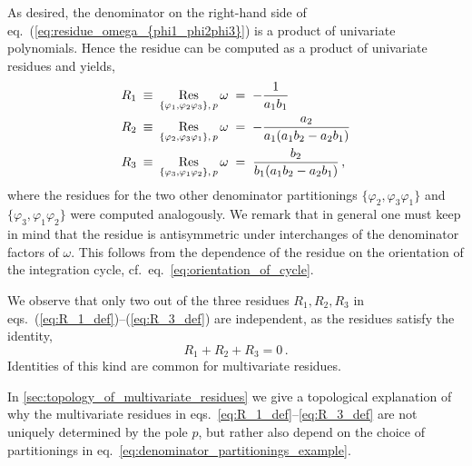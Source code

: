 \documentclass[dvipsnames,preprint,12pt,sort&compress]{elsarticle}
\begin{document}
As desired, the denominator on the right-hand side of eq.~(\ref{eq:residue_omega_{phi1_phi2phi3}})
is a product of univariate polynomials. Hence the residue can
be computed as a product of univariate residues and yields,
\begin{align}
R_1 \hspace{0.8mm}\equiv\hspace{0.8mm} \mathop{\mathrm{Res}}_{\{ \varphi_1, \varphi_2 \varphi_3 \}, \hspace{0.5mm} p} \omega
\hspace{1mm}&=\hspace{1mm} -\frac{1}{a_1 b_1}  \label{eq:R_1_def} \\
R_2 \hspace{0.8mm}\equiv\hspace{0.8mm} \mathop{\mathrm{Res}}_{\{ \varphi_2, \varphi_3 \varphi_1 \}, \hspace{0.5mm} p} \omega
\hspace{1mm}&=\hspace{1mm} -\frac{a_2}{a_1 (a_1 b_2 - a_2 b_1)} \label{eq:R_2_def} \\
R_3 \hspace{0.8mm}\equiv\hspace{0.8mm} \mathop{\mathrm{Res}}_{\{ \varphi_3, \varphi_1 \varphi_2 \}, \hspace{0.5mm} p} \omega
\hspace{1mm}&=\hspace{1mm} \frac{b_2}{b_1 (a_1 b_2 - a_2 b_1)} \,, \label{eq:R_3_def}
\end{align}
where the residues for the two other denominator partitionings $\{ \varphi_2, \varphi_3 \varphi_1\}$
and $\{ \varphi_3, \varphi_1 \varphi_2\}$ were computed analogously.
We remark that in general one must keep in mind that the residue
is antisymmetric under interchanges of the denominator factors of $\omega$.
This follows from the dependence of the residue on the orientation of
the integration cycle, cf.~eq.~\eqref{eq:orientation_of_cycle}.

We observe that only two out of the three residues $R_1, R_2, R_3$
in eqs.~(\ref{eq:R_1_def})--(\ref{eq:R_3_def}) are independent,
as the residues satisfy the identity,
\begin{equation}
R_1 + R_2 + R_3 = 0 \,.
\label{eq:residue_relation}
\end{equation}
Identities of this kind are common for multivariate residues.

In \ref{sec:topology_of_multivariate_residues} we give a topological explanation
of why the multivariate residues in eqs.~\eqref{eq:R_1_def}--\eqref{eq:R_3_def}
are not uniquely determined by the pole $p$, but rather also depend on the
choice of partitionings in eq.~\eqref{eq:denominator_partitionings_example}.
\end{document}
